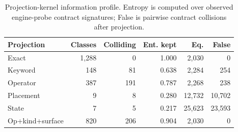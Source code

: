 \begin{table}[t]
\centering
\caption{Projection-kernel information profile. Entropy is computed over observed engine-probe contract signatures; False is pairwise contract collisions after projection.}
\label{tab:information-profile}
\footnotesize
\begin{tabular}{lrrrrr}
\toprule
Projection & Classes & Colliding & Ent. kept & Eq. & False \\
\midrule
Exact & 1,288 & 0 & 1.000 & 2,030 & 0 \\
Keyword & 148 & 81 & 0.638 & 2,284 & 254 \\
Operator & 387 & 191 & 0.787 & 2,268 & 238 \\
Placement & 9 & 8 & 0.280 & 12,732 & 10,702 \\
State & 7 & 5 & 0.217 & 25,623 & 23,593 \\
Op+kind+surface & 820 & 206 & 0.904 & 2,030 & 0 \\
\bottomrule
\end{tabular}
\end{table}
